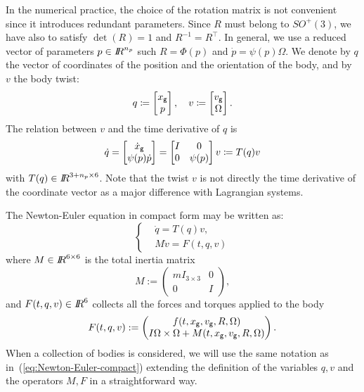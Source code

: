 In the numerical practice, the choice of the rotation matrix is not convenient since it introduces redundant parameters. Since $R$ must belong to $SO^+(3)$, we have also to satisfy $\det(R)=1$ and $R^{-1}=R^\top$. In general, we use a reduced vector of parameters $p\in\mbox{\rm $I\!\!R$}^{n_p}$ such $R = \Phi(p)$ and $\dot p = \psi(p)\Omega $. We denote  by $q$ the vector of coordinates of the position and the orientation of the body, and by $v$ {the body twist}:
\begin{equation}
  q \coloneqq \begin{bmatrix}
    x_{\sf \small g}\\
    p
  \end{bmatrix},\quad
  v \coloneqq \begin{bmatrix}
     v_{\sf \small g}\\
     \Omega
   \end{bmatrix}.
 \end{equation}
 The relation between $v$ and the time derivative of $q$ is
\begin{equation}
  \label{eq:TT}
  \dot q =
  \begin{bmatrix}
     \dot x_{\sf \small g}\\
     \psi(p) \dot p
   \end{bmatrix}
   =
   \begin{bmatrix}
     I & 0 \\
     0 & \psi(p)
   \end{bmatrix}
   v
   \coloneqq
   T(q) v
\end{equation}
with $T(q) \in \mbox{\rm $I\!\!R$}^{{3+n_p}\times 6}$.
{Note that the twist $v$ is not directly the time derivative of the coordinate vector as a major difference with Lagrangian systems. }

%
The Newton-Euler equation in compact form may be written as:
\begin{equation}
\label{eq:Newton-Euler-compact}
\boxed{ \left \{
 \begin{aligned}
  &\dot q=T(q)v, \\
  & M \dot v = F(t, q, v)
 \end{aligned}
 \right.}
\end{equation}
where $M\in\mbox{\rm $I\!\!R$}^{6\times6}$ is the total inertia matrix
\begin{equation}
  M:= \begin{pmatrix}
    m I_{3\times 3} & 0 \\
    0 & I
  \end{pmatrix},
\end{equation}
and $F(t, q, v)\in \mbox{\rm $I\!\!R$}^6$ collects all the forces and torques applied to the body
\begin{equation}
  F(t,q,v):= \begin{pmatrix}
    f(t,x_{\sf \small g},  v_{\sf \small g}, R, \Omega ) \\
    I \Omega \times \Omega + M(t,x_{\sf \small g}, v_{\sf \small g}, R, \Omega )
  \end{pmatrix}.
\end{equation}
When a collection of bodies is considered, we will use the same notation as in~(\ref{eq:Newton-Euler-compact}) extending the definition of the variables $q,v$ and the operators $M,F$ in a straightforward way.




